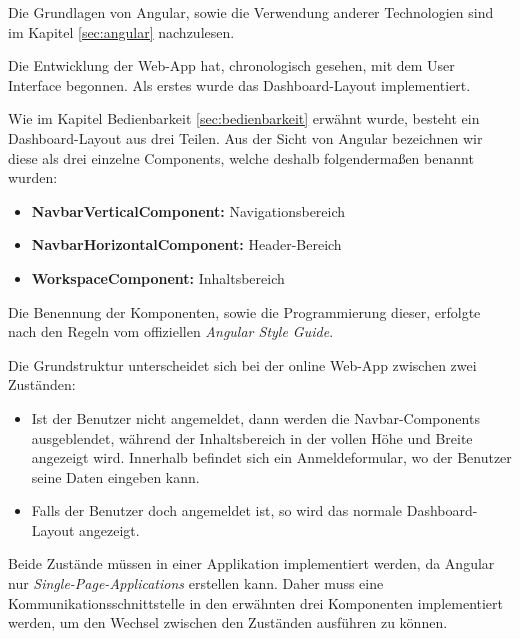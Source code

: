 Die Grundlagen von Angular, sowie die Verwendung anderer Technologien sind im Kapitel \ref{sec:angular} nachzulesen. 

Die Entwicklung der Web-App hat, chronologisch gesehen, mit dem User Interface begonnen. Als erstes wurde das Dashboard-Layout implementiert.

Wie im Kapitel Bedienbarkeit \ref{sec:bedienbarkeit} erwähnt wurde, besteht ein Dashboard-Layout aus drei Teilen. Aus der Sicht von Angular bezeichnen wir diese als drei einzelne Components, welche deshalb folgendermaßen benannt wurden:
\begin{itemize}
    \item \textbf{NavbarVerticalComponent:} Navigationsbereich
    \item \textbf{NavbarHorizontalComponent:} Header-Bereich
    \item \textbf{WorkspaceComponent:} Inhaltsbereich
\end{itemize}

Die Benennung der Komponenten, sowie die Programmierung dieser, erfolgte nach den Regeln vom offiziellen \textit{Angular Style Guide}. 

Die Grundstruktur unterscheidet sich bei der online Web-App zwischen zwei Zuständen:
\begin{itemize}
    \item Ist der Benutzer nicht angemeldet, dann werden die Navbar-Components ausgeblendet, während der Inhaltsbereich in der vollen Höhe und Breite angezeigt wird. Innerhalb befindet sich ein Anmeldeformular, wo der Benutzer seine Daten eingeben kann.
    \item Falls der Benutzer doch angemeldet ist, so wird das normale Dashboard-Layout angezeigt.
\end{itemize}

Beide Zustände müssen in einer Applikation implementiert werden, da Angular nur \textit{Single-Page-Applications} erstellen kann. Daher muss eine Kommunikationsschnittstelle in den erwähnten drei Komponenten implementiert werden, um den Wechsel zwischen den Zuständen ausführen zu können.

